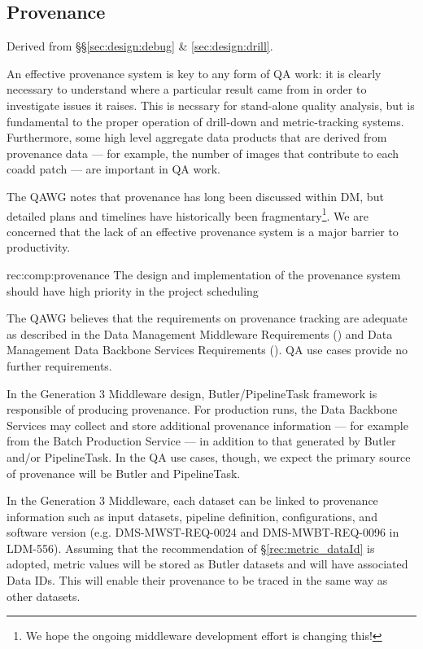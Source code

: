 \subsection{Provenance}
\label{sec:comp:provenance}

Derived from \S\S\ref{sec:design:debug} \& \ref{sec:design:drill}.

An effective provenance system is key to any form of QA work: it is clearly necessary to understand where a particular result came from in order to investigate issues it raises.
This is necssary for stand-alone quality analysis, but is fundamental to the proper operation of drill-down and metric-tracking systems.
Furthermore, some high level aggregate data products that are derived from provenance data --- for example, the number of images that contribute to each coadd patch --- are important in QA work.

The QAWG notes that provenance has long been discussed within DM, but detailed plans and timelines have historically been fragmentary\footnote{We hope the ongoing middleware development effort is changing this!}.
We are concerned that the lack of an effective provenance system is a major barrier to productivity.

\begin{recommendation}
  {rec:comp:provenance}
  {The design and implementation of the provenance system should have high priority in the project scheduling}
\end{recommendation}

The QAWG believes that the requirements on provenance tracking are adequate as described in the Data Management Middleware Requirements () and Data Management Data Backbone Services Requirements ().
QA use cases provide no further requirements.

In the Generation 3 Middleware design, Butler/PipelineTask framework is responsible of producing provenance.
For production runs, the Data Backbone Services may collect and store additional provenance information --- for example from the Batch Production Service --- in addition to that generated by Butler and/or PipelineTask.
In the QA use cases, though, we expect the primary source of provenance will be Butler and PipelineTask.

In the Generation 3 Middleware, each dataset can be linked to provenance information such as input datasets, pipeline definition, configurations, and software version (e.g. DMS-MWST-REQ-0024 and DMS-MWBT-REQ-0096 in LDM-556).
Assuming that the recommendation of \S\ref{rec:metric_dataId} is adopted, \glspl{metric value} will be stored as Butler datasets and will have associated Data IDs.
This will enable their provenance to be traced in the same way as other datasets.


